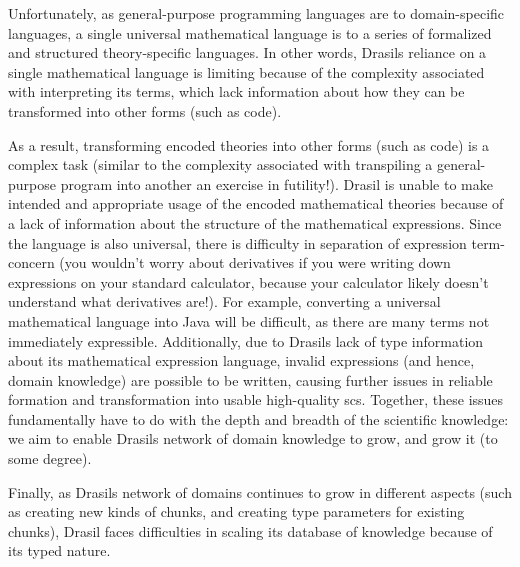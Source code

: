 
Unfortunately, as general-purpose programming languages are to domain-specific
languages, a single universal mathematical language is to a series of formalized
and structured theory-specific languages. In other words, Drasils reliance on a
single mathematical language is limiting because of the complexity associated
with interpreting its terms, which lack information about how they can be
transformed into other forms (such as code).

As a result, transforming encoded theories into other forms (such as code) is a
complex task (similar to the complexity associated with transpiling a
general-purpose program into another \textemdash{} an exercise in futility!).
Drasil is unable to make intended and appropriate usage of the encoded
mathematical theories because of a lack of information about the structure of
the mathematical expressions. Since the language is also universal, there is
difficulty in separation of expression term-concern (you wouldn't worry about
derivatives if you were writing down expressions on your standard calculator,
because your calculator likely doesn't understand what derivatives are!). For
example, converting a universal mathematical language into Java will be
difficult, as there are many terms not immediately expressible. Additionally,
due to Drasils lack of type information about its mathematical expression
language, invalid expressions (and hence, domain knowledge) are possible to be
written, causing further issues in reliable formation and transformation into
usable high-quality \acs{scs}. Together, these issues fundamentally have to do
with the depth and breadth of the scientific knowledge: we aim to enable Drasils
network of domain knowledge to grow, and grow it (to some degree).

Finally, as Drasils network of domains continues to grow in different aspects
(such as creating new kinds of chunks, and creating type parameters for existing
chunks), Drasil faces difficulties in scaling its database of knowledge because
of its typed nature.


